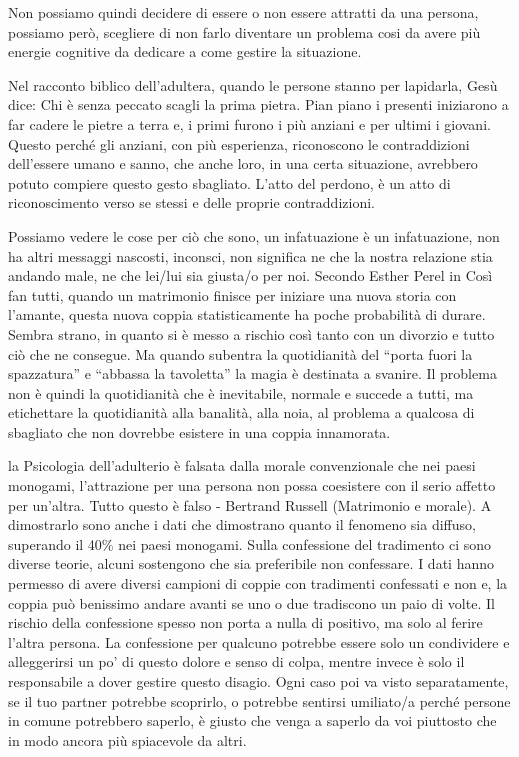 \documentclass[12pt]{book} %
\begin{document}
Non possiamo quindi decidere di essere o non essere attratti da una persona, possiamo però, scegliere di non farlo
diventare un problema cosi da avere più energie cognitive da dedicare a come gestire la situazione.

Nel racconto biblico dell'adultera, quando le persone stanno per lapidarla, Gesù dice: Chi è senza peccato scagli la
prima pietra. Pian piano i presenti iniziarono a far cadere le pietre a terra e, i primi furono i più anziani e per
ultimi i giovani. Questo perché gli anziani, con più esperienza, riconoscono le contraddizioni
dell'essere umano e sanno, che anche loro, in una certa situazione, avrebbero potuto compiere
questo gesto sbagliato. L'atto del perdono, è un atto di riconoscimento verso se stessi e delle proprie contraddizioni.

Possiamo vedere le cose per ciò che sono, un infatuazione è
un infatuazione, non ha altri messaggi nascosti, inconsci, non significa ne che la nostra relazione stia andando male,
ne che lei/lui sia giusta/o per noi. Secondo Esther Perel in Così fan
tutti, quando un matrimonio finisce per iniziare una nuova storia con
l'amante, questa nuova coppia statisticamente ha poche probabilità di durare. Sembra strano, in
quanto si è messo a rischio così tanto con un divorzio e tutto ciò che ne consegue. Ma quando subentra la quotidianità
del “porta fuori la spazzatura” e “abbassa la tavoletta” la magia è destinata a svanire. Il problema non è quindi la
quotidianità che è inevitabile, normale e succede a tutti, ma etichettare la quotidianità alla banalità, alla noia, al
problema a qualcosa di sbagliato che non dovrebbe esistere in una coppia
innamorata.

la Psicologia dell'adulterio è falsata dalla morale convenzionale che nei paesi monogami,
l'attrazione per una persona non possa coesistere con il serio affetto per
un'altra. Tutto questo è falso - Bertrand Russell (Matrimonio e
morale).
A dimostrarlo sono anche i dati che dimostrano quanto il fenomeno sia diffuso, superando il 40\% nei paesi monogami.
Sulla confessione del tradimento ci sono diverse teorie, alcuni sostengono che sia preferibile non confessare. I dati hanno permesso di avere diversi campioni di coppie con tradimenti confessati e non e, la coppia può benissimo andare avanti se uno o due tradiscono un paio di volte. Il rischio della confessione spesso non porta a nulla di positivo, ma solo al ferire l'altra persona. La confessione per qualcuno potrebbe essere solo un condividere e alleggerirsi un po' di questo dolore e senso di colpa, mentre invece è solo il responsabile a dover gestire questo disagio. 
Ogni caso poi va visto separatamente, se il tuo partner potrebbe scoprirlo, o potrebbe sentirsi umiliato/a perché persone in comune potrebbero saperlo, è giusto che venga a saperlo da voi piuttosto che in modo ancora più spiacevole da altri.
\end{document}
